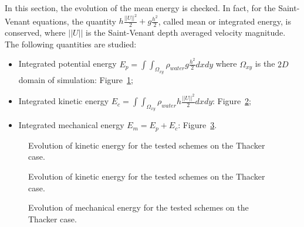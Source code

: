 In this section, the evolution of the mean energy is checked. In fact, for the Saint-Venant equations,
the quantity $h \frac{||U||^2}{2} + g \frac{h^2}{2}$, called mean or integrated energy, is conserved,
where $||U||$ is the Saint-Venant depth averaged velocity magnitude.
The following quantities are studied:
\begin{itemize}
\item Integrated potential energy \textbf{$E_p =\int\int_{\Omega_{xy}}\rho_{water} g \frac{h^2}{2} dxdy$} where $\Omega_{xy}$ is the $2D$ domain of simulation: Figure~\ref{fig:ritter:Ep};
\item Integrated kinetic energy \textbf{$E_c =\int\int_{\Omega_{xy}} \rho_{water} h \frac{||U||^2}{2} dxdy$}: Figure~\ref{fig:ritter:Ec};
\item Integrated mechanical energy \textbf{$E_m = E_p + E_c$}: Figure~\ref{fig:ritter:Em}.
\end{itemize}

\begin{figure}[H]
\centering
  \caption{Evolution of kinetic energy for the tested schemes on the Thacker case.}
\label{fig:ritter:Ep}
\end{figure}

\begin{figure}[H]
\centering
  \caption{Evolution of kinetic energy for the tested schemes on the Thacker case.}
\label{fig:ritter:Ec}
\end{figure}

\begin{figure}[H]
\centering
  \caption{Evolution of mechanical energy for the tested schemes on the Thacker case.}
\label{fig:ritter:Em}
\end{figure}

\newpage


